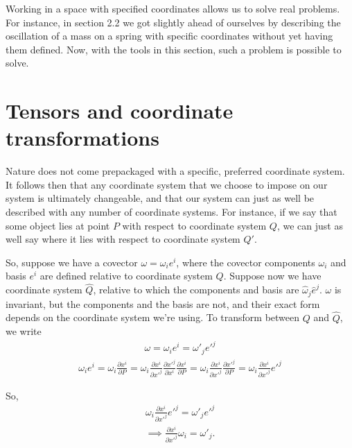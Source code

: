 \documentclass{book}
\begin{document}
Working in a space with specified coordinates allows us to solve real problems. For instance, in section 2.2 we got slightly ahead of ourselves by describing the oscillation of a mass on a spring with specific coordinates without yet having them defined. Now, with the tools in this section, such a problem is possible to solve.  



\section{Tensors and coordinate transformations}


Nature does not come prepackaged with a specific, preferred coordinate system. It follows then that any coordinate system that we choose to impose on our system is ultimately changeable, and that our system can just as well be described with any number of coordinate systems. For instance, if we say that some object lies at point $P$ with respect to coordinate system $Q$, we can just as well say where it lies with respect to coordinate system $Q'$. 


So, suppose we have a covector $\omega = \omega_i e^i$, where the covector components $\omega_i$ and basis $e^i$ are defined relative to coordinate system $Q$. Suppose now we have coordinate system $\hat{Q}$, relative to which the components and basis are $\hat{\omega}_j\hat{e}^j$. $\omega$ is invariant, but the components and the basis are not, and their exact form depends on the coordinate system we're using. To transform between $Q$ and $\hat{Q}$, we write \begin{gather}\omega = \omega_i e^i = \omega'_j e'^j  \end{gather}
\begin{gather}\omega_i e^i = \omega_i \frac{\partial x^i}{\partial P} = \omega_i \frac{\partial x^i}{\partial x'^j} \frac{\partial x'^j}{\partial x^i} \frac{\partial x^i}{\partial P}=  \omega_i \frac{\partial x^i}{\partial x'^j} \frac{\partial x'^j}{\partial P} = \omega_i \frac{\partial x^i}{\partial x'^j} e'^j\end{gather} 

So, \begin{gather}
\omega_i \frac{\partial x^i}{\partial x'^j} e'^j = \omega'_j e'^j
\end{gather}
\begin{gather} \implies  \frac{\partial x^i}{\partial x'^j} \omega_i = \omega'_j.
\end{gather}
\end{document}
